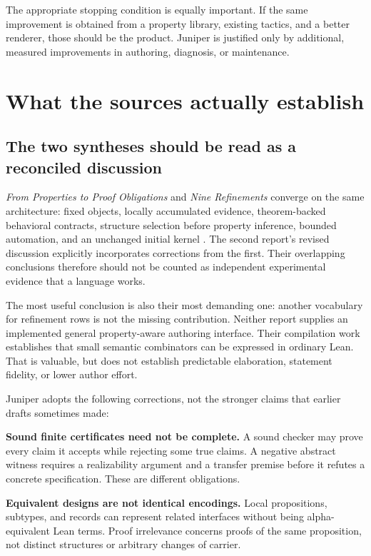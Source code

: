 \documentclass[11pt,a4paper]{article}
\theoremstyle{definition}\newtheorem{definition}[theorem]{Definition}
\theoremstyle{remark}\newtheorem{remark}[theorem]{Remark}
\begin{document}
The appropriate stopping condition is equally important. If the same improvement is obtained from a property library, existing tactics, and a better renderer, those should be the product. Juniper is justified only by additional, measured improvements in authoring, diagnosis, or maintenance.

\section{What the sources actually establish}
\label{sec:sources}
\subsection{The two syntheses should be read as a reconciled discussion}
\emph{From Properties to Proof Obligations} and \emph{Nine Refinements} converge on the same architecture: fixed objects, locally accumulated evidence, theorem-backed behavioral contracts, structure selection before property inference, bounded automation, and an unchanged initial kernel \cite{synA,synB}. The second report's revised discussion explicitly incorporates corrections from the first. Their overlapping conclusions therefore should not be counted as independent experimental evidence that a language works.

The most useful conclusion is also their most demanding one: another vocabulary for refinement rows is not the missing contribution. Neither report supplies an implemented general property-aware authoring interface. Their compilation work establishes that small semantic combinators can be expressed in ordinary Lean. That is valuable, but does not establish predictable elaboration, statement fidelity, or lower author effort.

Juniper adopts the following corrections, not the stronger claims that earlier drafts sometimes made:

\textbf{Sound finite certificates need not be complete.} A sound checker may prove every claim it accepts while rejecting some true claims. A negative abstract witness requires a realizability argument and a transfer premise before it refutes a concrete specification. These are different obligations.

\textbf{Equivalent designs are not identical encodings.} Local propositions, subtypes, and records can represent related interfaces without being alpha-equivalent Lean terms. Proof irrelevance concerns proofs of the same proposition, not distinct structures or arbitrary changes of carrier.
\end{document}
